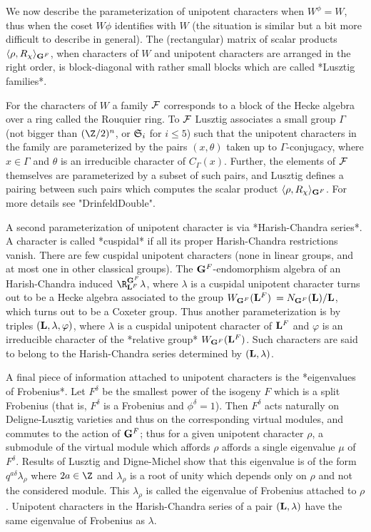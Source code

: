 We   now  describe  the  parameterization   of  unipotent  characters  when
$W^\phi=W$,  thus when the coset $W\phi$ identifies with $W$ (the situation
is  similar  but  a  bit  more  difficult  to  describe  in  general).  The
(rectangular) matrix of scalar products $\langle \rho,
R_\chi\rangle_{{\bf G}^F}$, when characters of $W$ and unipotent characters are
arranged  in the  right order,  is block-diagonal  with rather small blocks
which are called *Lusztig families*.

For the characters of $W$ a family ${\cal F}$ corresponds to a block of the
Hecke  algebra over a ring called the  Rouquier ring. To ${\cal F}$ Lusztig
associates  a small group $\Gamma$ (not bigger than $(\Z/2)^n$, or ${\mathfrak S}_i$
for  $i\le  5$)  such  that  the  unipotent  characters  in  the family are
parameterized  by the  pairs $(x,\theta)$  taken up  to $\Gamma$-conjugacy,
where   $x\in\Gamma$   and   $\theta$   is   an  irreducible  character  of
$C_\Gamma(x)$.   Further,  the  elements  of   ${\cal  F}$  themselves  are
parameterized  by a  subset of  such pairs,  and Lusztig  defines a pairing
between  such  pairs  which  computes  the  scalar  product  $\langle \rho,
R_\chi\rangle_{{\bf G}^F}$. For more details see "DrinfeldDouble".

A  second parameterization  of unipotent  character is  via *Harish-Chandra
series*.  A character is called *cuspidal* if all its proper Harish-Chandra
restrictions  vanish. There are few  cuspidal unipotent characters (none in
linear   groups,  and  at   most  one  in   other  classical  groups).  The
${\bf G}^F$-endomorphism algebra of an Harish-Chandra induced
$\R_{\bL^F}^{\bG^F}\lambda$,   where  $\lambda$  is  a  cuspidal  unipotent
character  turns  out  to  be  a  Hecke  algebra  associated  to  the group
$W_{{\bf G}^F}({\bf L}^F)\:=N_{{\bf G}^F}({\bf L})/{\bf L}$,  which  turns  out  to be a Coxeter
group. Thus another parameterization is by triples $({\bf L},\lambda,\varphi)$,
where  $\lambda$ is a cuspidal unipotent character of ${\bf L}^F$ and $\varphi$
is  an irreducible  character of  the *relative  group* $W_{{\bf G}^F}({\bf L}^F)$.
Such  characters are said to belong to the Harish-Chandra series determined
by $({\bf L},\lambda)$.

A  final  piece  of  information  attached  to  unipotent characters is the
*eigenvalues  of Frobenius*.  Let $F^\delta$  be the  smallest power of the
isogeny  $F$ which is a split Frobenius (that is, $F^\delta$ is a Frobenius
and  $\phi^\delta=1$).  Then $F^\delta$  acts  naturally on Deligne-Lusztig
varieties  and thus on  the corresponding virtual  modules, and commutes to
the  action  of  ${\bf G}^F$;  thus  for  a given unipotent character $\rho$, a
submodule  of  the  virtual  module  which  affords $\rho$ affords a single
eigenvalue  $\mu$ of $F^\delta$.  Results of Lusztig  and Digne-Michel show
that  this  eigenvalue  is  of  the  form  $q^{a\delta}\lambda_\rho$  where
$2a\in\Z$  and  $\lambda_\rho$  is  a  root  of unity which depends only on
$\rho$  and not  the considered  module. This  $\lambda_\rho$ is called the
eigenvalue  of Frobenius  attached to  $\rho$. Unipotent  characters in the
Harish-Chandra series of a pair $({\bf L},\lambda)$ have the same eigenvalue of
Frobenius as $\lambda$.

